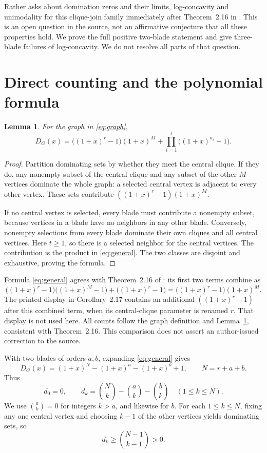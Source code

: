 \documentclass[11pt,a4paper]{article}
\newtheorem{lemma}{Lemma}
\begin{document}
Rather asks about domination zeros and their limits, log-concavity
and unimodality for this clique-join family immediately after
Theorem~2.16 in \cite[p.~286]{R}. This is an open question in the
source, not an affirmative conjecture that all these properties
hold. We prove the full positive two-blade statement and give
three-blade failures of log-concavity. We do not resolve all parts
of that question.

\section{Direct counting and the polynomial formula}
\begin{lemma}\label{lem:count}
For the graph in \eqref{eq:graph},
\begin{equation}\label{eq:general}
 D_G(x)=\bigl((1+x)^r-1\bigr)(1+x)^M
              +\prod_{i=1}^{t}\bigl((1+x)^{a_i}-1\bigr).
\end{equation}
\end{lemma}
\begin{proof}
Partition dominating sets by whether they meet the central clique.
If they do, any nonempty subset of the central clique and any subset
of the other $M$ vertices dominate the whole graph: a selected central
vertex is adjacent to every other vertex. These sets contribute
$((1+x)^r-1)(1+x)^M$.

If no central vertex is selected, every blade must contribute a
nonempty subset, because vertices in a blade have no neighbors in
any other blade. Conversely, nonempty selections from every blade
dominate their own cliques and all central vertices. Here $t\ge1$,
so there is a selected neighbor for the central vertices.
The contribution is the product in \eqref{eq:general}.
The two classes are disjoint and exhaustive, proving the formula.
\end{proof}

Formula \eqref{eq:general} agrees with Theorem~2.16 of \cite{R}:
its first two terms combine as
\[
 \bigl((1+x)^r-1\bigr)\bigl((1+x)^M-1\bigr)
       +\bigl((1+x)^r-1\bigr)
 =\bigl((1+x)^r-1\bigr)(1+x)^M.
\]
The printed display in Corollary~2.17 contains an additional
$((1+x)^r-1)$ after this combined term, when its central-clique
parameter is renamed $r$. That display is not used here. All
counts follow the graph definition and Lemma~\ref{lem:count},
consistent with Theorem~2.16. This comparison does not assert an
author-issued correction to the source.

With two blades of orders $a,b$, expanding \eqref{eq:general} gives
\begin{equation}\label{eq:two}
 D_G(x)=(1+x)^N-(1+x)^a-(1+x)^b+1,
 \qquad N=r+a+b.
\end{equation}
Thus
\begin{equation}\label{eq:coeff}
 d_0=0,\qquad
 d_k=\binom Nk-\binom ak-\binom bk\quad(1\le k\le N).
\end{equation}
We use $\binom ak=0$ for integers $k>a$, and likewise for $b$.
For each $1\le k\le N$, fixing any one central vertex and choosing
$k-1$ of the other vertices yields dominating sets, so
\begin{equation}\label{eq:positive}
 d_k\ge\binom{N-1}{k-1}>0.
\end{equation}
\end{document}
